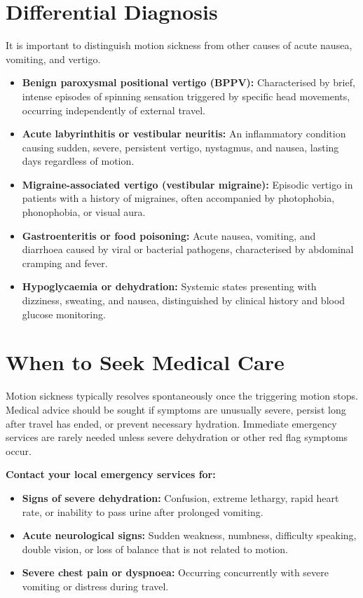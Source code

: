\section*{Differential Diagnosis}
It is important to distinguish motion sickness from other causes of acute nausea, vomiting, and vertigo.
\begin{itemize}
    \item \textbf{Benign paroxysmal positional vertigo (BPPV):} Characterised by brief, intense episodes of spinning sensation triggered by specific head movements, occurring independently of external travel.
    \item \textbf{Acute labyrinthitis or vestibular neuritis:} An inflammatory condition causing sudden, severe, persistent vertigo, nystagmus, and nausea, lasting days regardless of motion.
    \item \textbf{Migraine-associated vertigo (vestibular migraine):} Episodic vertigo in patients with a history of migraines, often accompanied by photophobia, phonophobia, or visual aura.
    \item \textbf{Gastroenteritis or food poisoning:} Acute nausea, vomiting, and diarrhoea caused by viral or bacterial pathogens, characterised by abdominal cramping and fever.
    \item \textbf{Hypoglycaemia or dehydration:} Systemic states presenting with dizziness, sweating, and nausea, distinguished by clinical history and blood glucose monitoring.
\end{itemize}

\section*{When to Seek Medical Care}
Motion sickness typically resolves spontaneously once the triggering motion stops. Medical advice should be sought if symptoms are unusually severe, persist long after travel has ended, or prevent necessary hydration. Immediate emergency services are rarely needed unless severe dehydration or other red flag symptoms occur.

\textbf{Contact your local emergency services for:}
\begin{itemize}
    \item \textbf{Signs of severe dehydration:} Confusion, extreme lethargy, rapid heart rate, or inability to pass urine after prolonged vomiting.
    \item \textbf{Acute neurological signs:} Sudden weakness, numbness, difficulty speaking, double vision, or loss of balance that is not related to motion.
    \item \textbf{Severe chest pain or dyspnoea:} Occurring concurrently with severe vomiting or distress during travel.
\end{itemize}

